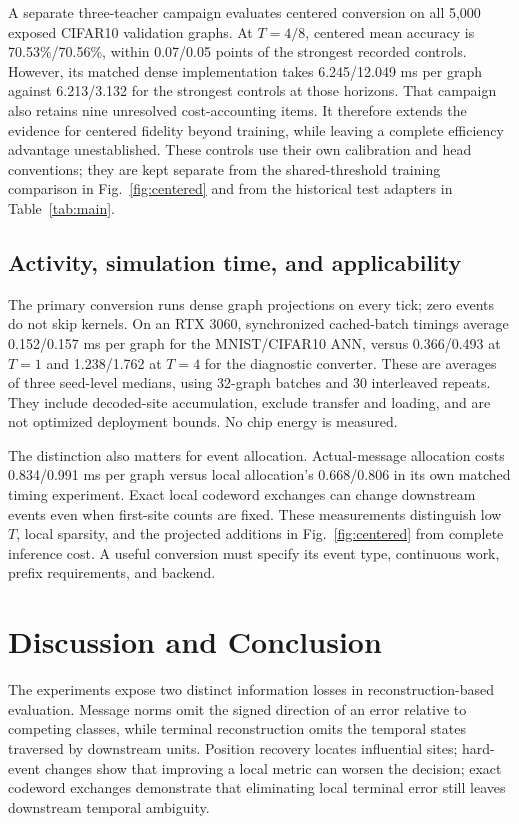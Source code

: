 \documentclass[10pt,twocolumn,letterpaper]{article}
\begin{document}
A separate three-teacher campaign evaluates centered conversion on all 5,000 exposed CIFAR10 validation graphs. At $T=4/8$, centered mean accuracy is 70.53\%/70.56\%, within 0.07/0.05 points of the strongest recorded controls. However, its matched dense implementation takes 6.245/12.049 ms per graph against 6.213/3.132 for the strongest controls at those horizons. That campaign also retains nine unresolved cost-accounting items. It therefore extends the evidence for centered fidelity beyond training, while leaving a complete efficiency advantage unestablished. These controls use their own calibration and head conventions; they are kept separate from the shared-threshold training comparison in Fig.~\ref{fig:centered} and from the historical test adapters in Table~\ref{tab:main}.

\subsection{Activity, simulation time, and applicability}
The primary conversion runs dense graph projections on every tick; zero events do not skip kernels. On an RTX 3060, synchronized cached-batch timings average 0.152/0.157 ms per graph for the MNIST/CIFAR10 ANN, versus 0.366/0.493 at $T=1$ and 1.238/1.762 at $T=4$ for the diagnostic converter. These are averages of three seed-level medians, using 32-graph batches and 30 interleaved repeats. They include decoded-site accumulation, exclude transfer and loading, and are not optimized deployment bounds. No chip energy is measured.

The distinction also matters for event allocation. Actual-message allocation costs 0.834/0.991 ms per graph versus local allocation's 0.668/0.806 in its own matched timing experiment. Exact local codeword exchanges can change downstream events even when first-site counts are fixed. These measurements distinguish low $T$, local sparsity, and the projected additions in Fig.~\ref{fig:centered} from complete inference cost. A useful conversion must specify its event type, continuous work, prefix requirements, and backend.

\section{Discussion and Conclusion}
The experiments expose two distinct information losses in reconstruction-based evaluation. Message norms omit the signed direction of an error relative to competing classes, while terminal reconstruction omits the temporal states traversed by downstream units. Position recovery locates influential sites; hard-event changes show that improving a local metric can worsen the decision; exact codeword exchanges demonstrate that eliminating local terminal error still leaves downstream temporal ambiguity.
\end{document}
